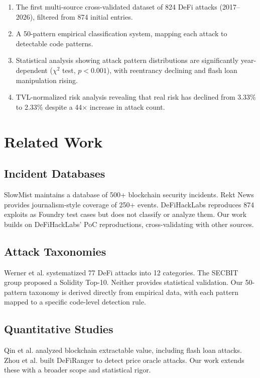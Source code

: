 \documentclass[10pt,conference]{IEEEtran}
\begin{document}
\begin{enumerate}
  \item The first multi-source cross-validated dataset of 824 DeFi attacks (2017–2026), filtered from 874 initial entries.
  \item A 50-pattern empirical classification system, mapping each attack to detectable code patterns.
  \item Statistical analysis showing attack pattern distributions are significantly year-dependent ($\chi^2$ test, $p < 0.001$), with reentrancy declining and flash loan manipulation rising.
  \item TVL-normalized risk analysis revealing that real risk has declined from 3.33\% to 2.33\% despite a 44× increase in attack count.
\end{enumerate}

\section{Related Work}

\subsection{Incident Databases}
SlowMist \cite{slowmist2021} maintains a database of 500+ blockchain security incidents. Rekt News \cite{rekt2020} provides journalism-style coverage of 250+ events. DeFiHackLabs \cite{sun2024defihacklabs} reproduces 874 exploits as Foundry test cases but does not classify or analyze them. Our work builds on DeFiHackLabs' PoC reproductions, cross-validating with other sources.

\subsection{Attack Taxonomies}
Werner et al. \cite{werner2023sok} systematized 77 DeFi attacks into 12 categories. The SECBIT group proposed a Solidity Top-10. Neither provides statistical validation. Our 50-pattern taxonomy is derived directly from empirical data, with each pattern mapped to a specific code-level detection rule.

\subsection{Quantitative Studies}
Qin et al. \cite{qin2021quantifying} analyzed blockchain extractable value, including flash loan attacks. Zhou et al. \cite{zhou2022defi} built DeFiRanger to detect price oracle attacks. Our work extends these with a broader scope and statistical rigor.
\end{document}
